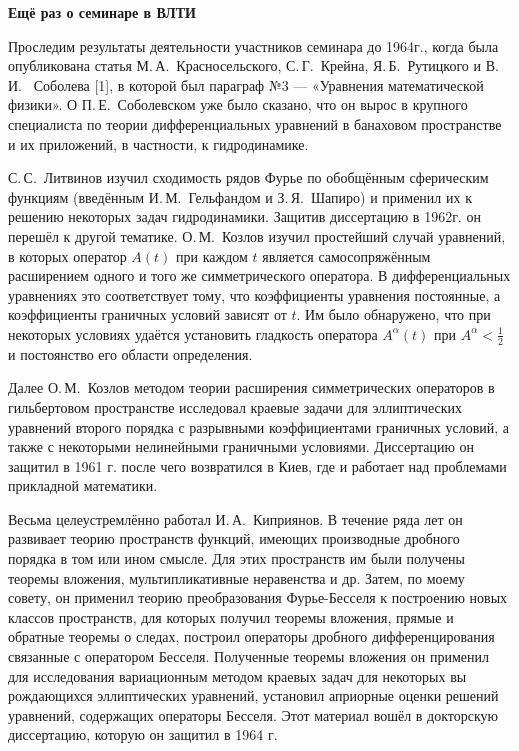 {\bf Ещё раз о семинаре в ВЛТИ}

Проследим результаты деятельности участников семинара до 1964г., когда была опубликована статья М.\,А.~Красносельского, С.\,Г.~Крейна, Я.\,Б.~Рутицкого и В.\,И.~ Соболева [1], в которой был параграф №3 --- «Уравнения математической физики». О П.\,Е.~Соболевском уже было сказано, что он вырос в крупного
специалиста по теории дифференциальных уравнений в банаховом пространстве и их приложений, в частности, к гидродинамике.

С.\,С.~Литвинов изучил сходимость рядов Фурье по обобщённым сферическим функциям
(введённым И.\,М.~Гель\-фа\-н\-дом и З.\,Я.~Шапиро) и применил их к решению некоторых задач гидродинамики. Защитив диссертацию в 1962г. он перешёл к другой тематике. О.\,М.~Козлов изучил простейший случай уравнений, в которых оператор $A(t)$ при каждом $t$ является самосопряжённым расширением одного и того же симметрического оператора. В дифференциальных уравнениях это соответствует тому, что коэффициенты уравнения постоянные, а коэффициенты граничных условий зависят от $t$. Им было обнаружено, что при некоторых условиях удаётся установить гладкость оператора $A^{\alpha}(t)$ при $A^{\alpha} < \frac{1}{2}$  и постоянство его области определения.

Далее О.\,М.~Козлов методом теории расширения симметрических операторов в гильбертовом пространстве исследовал краевые задачи для эллиптических уравнений второго порядка с разрывными коэффициентами граничных условий, а также с некоторыми нелинейными граничными условиями. Диссертацию он защитил в 1961 г. после чего возвратился в Киев, где и работает над проблемами прикладной математики.

Весьма целеустремлённо работал И.\,А.~Киприянов. В течение ряда лет он развивает теорию пространств функций, имеющих производные дробного порядка в том или ином смысле. Для этих пространств им были получены теоремы вложения, мультипликативные неравенства и др. Затем, по моему совету, он применил теорию преобразования
Фурье-Бесселя к построению новых классов пространств, для которых получил теоремы вложения, прямые и обратные теоремы о следах, построил операторы дробного дифференцирования связанные с оператором Бесселя. Полученные теоремы вложения он применил для исследования вариационным методом краевых задач для некоторых вы рождающихся эллиптических уравнений, установил априорные оценки решений уравнений, содержащих операторы Бесселя. Этот материал вошёл в докторскую диссертацию, которую он защитил в 1964 г.

